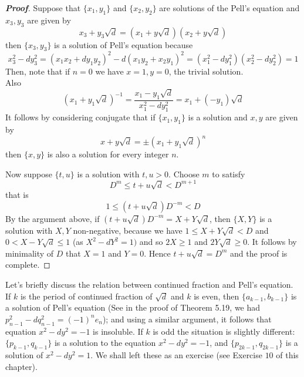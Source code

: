 \begin{proof}[\bf Proof] Suppose that $\{x_1,y_1\}$ and $\{x_2,y_2\}$ are solutions of the Pell's equation and $x_3,y_3$ are given by
$$x_3+y_3\sqrt{d}=(x_1+y\sqrt{d})(x_2+y\sqrt{d})$$
then $\{x_3,y_3\}$ is a solution of Pell's equation because
$$x^2_3-dy^2_3=(x_1x_2+dy_1y_2)^2-d(x_1y_2+x_2y_1)^2=(x^2_1-dy^2_1)(x^2_2-dy^2_2)=1$$
Then, note that if $n=0$ we have $x=1, y=0$, the trivial solution.\\
Also
$$(x_1+y_1 \sqrt{d})^{-1} =\frac{x_1-y_1\sqrt{d}}{x^2_1-dy^2_1}=x_1+(-y_1)\sqrt{d}$$
It follows by considering conjugate that if $\{x_1,y_1\}$ is a solution and $x,y$ are given by
$$x+y\sqrt{d}=\pm(x_1+y_1 \sqrt{d})^n$$ then $\{x,y\}$ is also a solution for every integer $n$.

Now suppose $\{t,u\}$ is a solution with $t,u>0$. Choose $m$ to satisfy
$$D^m\le t+u\sqrt{d} < D^{m+1}$$ that is
$$1 \le (t+u\sqrt{d})D^{-m} < D$$
By the argument above, if $(t+u\sqrt{d})D^{-m}= X+Y\sqrt{d}$, then $\{X,Y\}$ is a solution with
$X,Y$ non-negative, because we have $1 \le X+Y\sqrt{d} <D$ and
$0< X- Y\sqrt{d} \le 1$ (as $X^2-dY^2=1)$
and so $2X \ge 1$ and $2Y\sqrt{d} \ge 0$. It follows by minimality of
$D$ that $X=1$ and $Y=0$. Hence $t+u\sqrt{d}=D^m$ and the proof is complete.
\end{proof}
Let's briefly discuss the relation between continued fraction and Pell's equation. If $k$ is the period of continued fraction of $\sqrt{d}$ and $k$ is even, then $\{a_{k-1},b_{k-1}\}$ is a solution of Pell's equation (See in the proof of Theorem 5.19, we had $p^2_{n-1}-dq^2_{n-1}=(-1)^n e_n$); and using a similar argument, it follows that equation $x^2-dy^2=-1$ is insoluble. If $k$ is odd the situation is slightly different: $\{p_{k-1},q_{k-1}\}$ is a solution to the equation $x^2-dy^2=-1$, and
$\{p_{2k-1},q_{2k-1}\}$ is a solution of $x^2-dy^2=1$. We shall left these as an exercise (see Exercise $10$ of this chapter).


